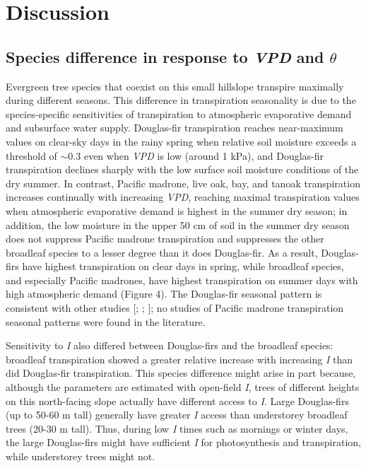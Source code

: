 \section{Discussion}

\subsection{Species difference in response to \textit{VPD} and $\theta$}
Evergreen tree species that coexist on this small hillslope transpire maximally during different seasons.  This difference in transpiration seasonality is due to the species-specific sensitivities of transpiration to atmospheric evaporative demand and subsurface water supply.  Douglas-fir transpiration reaches near-maximum values on clear-sky days in the rainy spring when relative soil moisture exceeds a threshold of $\sim$0.3 even when \textit{VPD} is low (around 1 kPa), and Douglas-fir transpiration declines sharply with the low surface soil moisture conditions of the dry summer.  In contrast, Pacific madrone, live oak, bay, and tanoak transpiration increases continually with increasing \textit{VPD}, reaching maximal transpiration values when atmospheric evaporative demand is highest in the summer dry season; in addition, the low moisture in the upper 50 cm of soil in the summer dry season does not suppress Pacific madrone transpiration and suppresses the other broadleaf species to a lesser degree than it does Douglas-fir.  As a result, Douglas-firs have highest transpiration on clear days in spring, while broadleaf species, and especially Pacific madrones, have highest transpiration on summer days with high atmospheric demand (Figure 4).  The Douglas-fir seasonal pattern is consistent with other studies [\cite{jassal2009evapotranspiration}; \cite{moore2004structural}; \cite{granier1987evaluation}]; no studies of Pacific madrone transpiration seasonal patterns were found in the literature.

Sensitivity to \textit{I} also differed between Douglas-firs and the broadleaf species: broadleaf transpiration showed a greater relative increase with increasing \textit{I} than did Douglas-fir transpiration. This species difference might arise in part because, although the parameters are estimated with open-field \textit{I}, trees of different heights on this north-facing slope actually have different access to \textit{I}. Large Douglas-firs (up to 50-60 m tall) generally have greater \textit{I} access than understorey broadleaf trees (20-30 m tall).  Thus, during low \textit{I} times such as mornings or winter days, the large Douglas-firs might have sufficient \textit{I} for photosynthesis and transpiration, while understorey trees might not.

